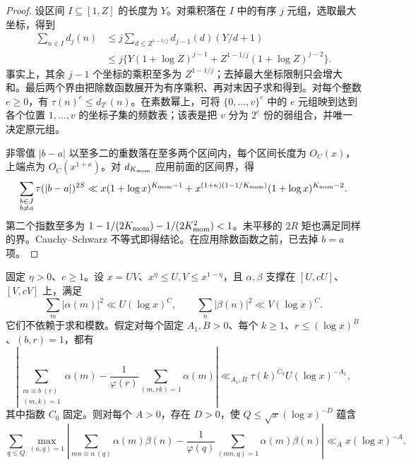 \begin{proof}
设区间 $I\subseteq[1,Z]$ 的长度为 $Y$。对乘积落在 $I$ 中的有序 $j$ 元组，选取最大坐标，得到
\begin{align*}
 \sum_{n\in I}d_j(n)
 &\le j\sum_{d\le Z^{1-1/j}}d_{j-1}(d)(Y/d+1)\\
 &\le j\{Y(1+\log Z)^{j-1}
              +Z^{1-1/j}(1+\log Z)^{j-2}\}.
\end{align*}
事实上，其余 $j-1$ 个坐标的乘积至多为 $Z^{1-1/j}$；去掉最大坐标限制只会增大和。最后两个界由把除数函数展开为有序乘积、再对末因子求和得到。对每个整数 $e\ge0$，有 $\tau(n)^e\le d_{2^e}(n)$。在素数幂上，可将 $\{0,\ldots,v\}^e$ 中的 $e$ 元组映到达到各个位置 $1,\ldots,v$ 的坐标子集的频数表；该表是把 $v$ 分为 $2^e$ 份的弱组合，并唯一决定原元组。

非零值 $|b-a|$ 以至多二的重数落在至多两个区间内，每个区间长度为 $O_C(x)$，上端点为 $O_C(x^{1+\kappa})$。对 $d_{K_{\rm mom}}$ 应用前面的区间界，得
\[
 \sum_{\substack{b\in J\\b\ne a}}\tau(|b-a|)^{2S}
 \ll x(1+\log x)^{K_{\rm mom}-1}
       +x^{(1+\kappa)(1-1/K_{\rm mom})}(1+\log x)^{K_{\rm mom}-2}.
\]
第二个指数至多为 $1-1/(2K_{\rm mom})-1/(2K_{\rm mom}^2)<1$。未平移的 $2R$ 矩也满足同样的界。Cauchy--Schwarz 不等式即得结论。在应用除数函数之前，已去掉 $b=a$ 项。
\end{proof}

\begin{lemma}[低于二分之一水平的卷积估计]
\label{coef:low-rank-BV}
固定 $\eta>0$、$c\ge1$。设 $x=UV$、$x^\eta\le U,V\le x^{1-\eta}$，且 $\alpha,\beta$ 支撑在 $[U,cU]$、$[V,cV]$ 上，满足
\[
 \sum_m|\alpha(m)|^2\ll U(\log x)^C,\qquad
 \sum_n|\beta(n)|^2\ll V(\log x)^C.
\]
它们不依赖于求和模数。假定对每个固定 $A_1,B>0$、每个 $k\ge1$、$r\le(\log x)^B$、$(b,r)=1$，都有
\begin{equation}
 \left|\sum_{\substack{m\equiv b\ (r)\\(m,k)=1}}\alpha(m)
 -\frac1{\varphi(r)}\sum_{(m,rk)=1}\alpha(m)\right|
 \ll_{A_1,B}\tau(k)^{C_0}U(\log x)^{-A_1},
 \label{coef:small-aux-SW}
\end{equation}
其中指数 $C_0$ 固定。则对每个 $A>0$，存在 $D>0$，使 $Q\le\sqrt x(\log x)^{-D}$ 蕴含
\[
 \sum_{q\le Q}\max_{(a,q)=1}
 \left|\sum_{mn\equiv a\ (q)}\alpha(m)\beta(n)
 -\frac1{\varphi(q)}\sum_{(mn,q)=1}\alpha(m)\beta(n)\right|
 \ll_A x(\log x)^{-A}.
\]
\end{lemma}

